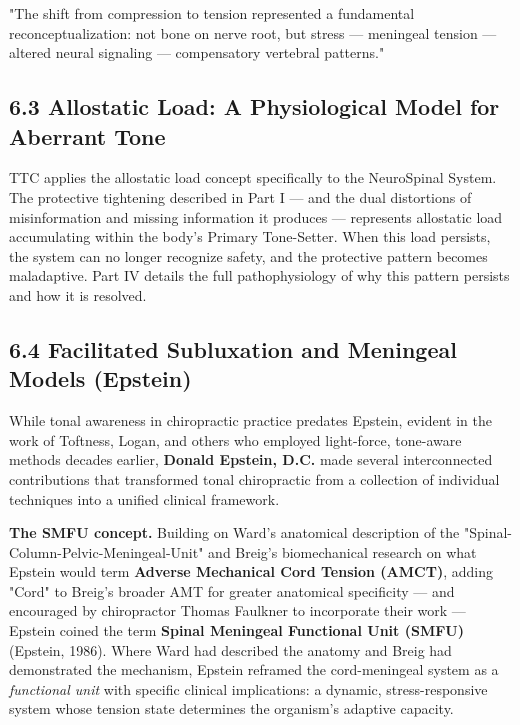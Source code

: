 \documentclass[11pt,letterpaper]{article}
\begin{document}
\begin{pullquotebox}
"The shift from compression to tension represented a fundamental reconceptualization: not bone on nerve root, but stress — meningeal tension — altered neural signaling — compensatory vertebral patterns."
\end{pullquotebox}


\subsection{6.3 Allostatic Load: A Physiological Model for Aberrant Tone}

TTC applies the allostatic load concept specifically to the NeuroSpinal System. The protective tightening described in Part I — and the dual distortions of misinformation and missing information it produces — represents allostatic load accumulating within the body's Primary Tone-Setter. When this load persists, the system can no longer recognize safety, and the protective pattern becomes maladaptive. Part IV details the full pathophysiology of why this pattern persists and how it is resolved.


\subsection{6.4 Facilitated Subluxation and Meningeal Models (Epstein)}

While tonal awareness in chiropractic practice predates Epstein, evident in the work of Toftness, Logan, and others who employed light-force, tone-aware methods decades earlier, \textbf{Donald Epstein, D.C.} made several interconnected contributions that transformed tonal chiropractic from a collection of individual techniques into a unified clinical framework.


\textbf{The SMFU concept.} Building on Ward's anatomical description of the "Spinal-Column-Pelvic-Meningeal-Unit" and Breig's biomechanical research on what Epstein would term \textbf{Adverse Mechanical Cord Tension (AMCT)}, adding "Cord" to Breig's broader AMT for greater anatomical specificity — and encouraged by chiropractor Thomas Faulkner to incorporate their work — Epstein coined the term \textbf{Spinal Meningeal Functional Unit (SMFU)} (Epstein, 1986). Where Ward had described the anatomy and Breig had demonstrated the mechanism, Epstein reframed the cord-meningeal system as a \textit{functional unit} with specific clinical implications: a dynamic, stress-responsive system whose tension state determines the organism's adaptive capacity.
\end{document}
